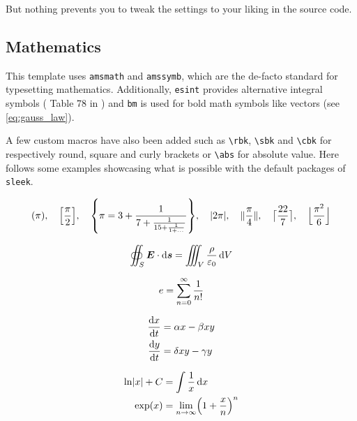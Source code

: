 \documentclass[a4paper, 12pt]{report}
\def\tbs{\textbackslash}
\begin{document}
    But nothing prevents you to tweak the settings to your liking in the source code.

    \subsection{Mathematics}

    This template uses \texttt{amsmath} and \texttt{amssymb}, which are the de-facto standard for typesetting mathematics. Additionally, \texttt{esint} provides alternative integral symbols (\cf{} Table 78 in \cite{pakin2020comprehensive}) and \texttt{bm} is used for bold math symbols like vectors (see \eqref{eq:gauss_law}).

    A few custom macros have also been added such as \texttt{\tbs{}rbk}, \texttt{\tbs{}sbk} and \texttt{\tbs{}cbk} for respectively round, square and curly brackets or \texttt{\tbs{}abs} for absolute value. Here follows some examples showcasing what is possible with the default packages of \texttt{sleek}.

    \[
        \rbk*{\pi}, \quad \sbk*{\frac{\pi}{2}}, \quad \cbk*{\pi=3 + \frac{1}{7 + \frac{1}{15 + \frac{1}{1 + \dots}}}}, \quad \abs{2 \pi}, \quad \norm{\frac{\pi}{4}}, \quad \ceil[\big]{\frac{22}{7}}, \quad \floor[\Big]{\frac{\pi^2}{6}}
    \]

    \begin{equation}\label{eq:gauss_law}
        \oiint_S \bm{E} \cdot \operatorname{d}\!{\bm{s}} = \iiint_V \frac{\rho}{\varepsilon_0} \operatorname{d}\!{V}
    \end{equation}

    \begin{equation*}
        e = \sum_{n=0}^\infty \frac{1}{n!}
    \end{equation*}

    \begin{subequations}
        \begin{align}
            \frac{\operatorname{d}\!{x}}{\operatorname{d}\!{t}} & = \alpha x - \beta xy \\
            \frac{\operatorname{d}\!{y}}{\operatorname{d}\!{t}} & = \delta xy - \gamma y
        \end{align}
    \end{subequations}

    \begin{align*}
        \ln \abs{x} + C & = \int \frac{1}{x} \d{x} \\
        \exp(x) & = \lim_{n \to \infty} \rbk*{1 + \frac{x}{n}}^n
    \end{align*}
\end{document}
